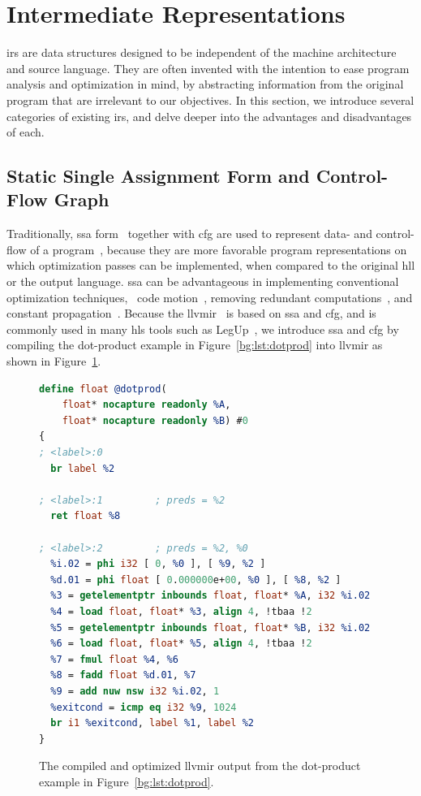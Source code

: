 \section{Intermediate Representations}
\label{bg:sec:intermediate}

\Glspl{ir} are data structures designed to be independent of the machine
architecture and source language.  They are often invented with the intention
to ease program analysis and optimization in mind, by abstracting information
from the original program that are irrelevant to our objectives.  In this
section, we introduce several categories of existing \glspl{ir}, and delve
deeper into the advantages and disadvantages of each.

\subsection{Static Single Assignment Form and Control-Flow Graph}
\label{bg:sub:ssa_cfg}

Traditionally, \gls{ssa} form~\cite{alpern88, rau92} together with \gls{cfg}
are used to represent data- and control-flow of a program~\cite{cytron91},
because they are more favorable program representations on which optimization
passes can be implemented, when compared to the original \gls{hll} or the
output language.  \Gls{ssa} can be advantageous in implementing conventional
optimization techniques, \eg~code motion~\cite{cytron86}, removing redundant
computations~\cite{rosen88}, and constant propagation~\cite{cytron91}.
Because the \gls{llvmir}~\cite{llvm_ir} is based on \gls{ssa} and \gls{cfg},
and is commonly used in many \gls{hls} tools such as LegUp~\cite{legup},
we introduce \gls{ssa} and \gls{cfg} by compiling the dot-product
example in Figure~\ref{bg:lst:dotprod} into \gls{llvmir} as shown in
Figure~\ref{bg:lst:dotprod_ll}.
\begin{figure}[ht]
    \centering
    \begin{lstlisting}[language=LLVM]
define float @dotprod(
    float* nocapture readonly %A,
    float* nocapture readonly %B) #0
{
; <label>:0
  br label %2

; <label>:1         ; preds = %2
  ret float %8

; <label>:2         ; preds = %2, %0
  %i.02 = phi i32 [ 0, %0 ], [ %9, %2 ]
  %d.01 = phi float [ 0.000000e+00, %0 ], [ %8, %2 ]
  %3 = getelementptr inbounds float, float* %A, i32 %i.02
  %4 = load float, float* %3, align 4, !tbaa !2
  %5 = getelementptr inbounds float, float* %B, i32 %i.02
  %6 = load float, float* %5, align 4, !tbaa !2
  %7 = fmul float %4, %6
  %8 = fadd float %d.01, %7
  %9 = add nuw nsw i32 %i.02, 1
  %exitcond = icmp eq i32 %9, 1024
  br i1 %exitcond, label %1, label %2
}
    \end{lstlisting}
    \caption{%
        The compiled and optimized \gls{llvmir} output from the dot-product
        example in Figure~\ref{bg:lst:dotprod}.
    }\label{bg:lst:dotprod_ll}
\end{figure}

